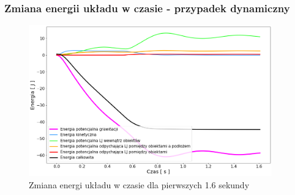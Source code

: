 \documentclass{beamer}
\begin{document}
\begin{frame}
    \frametitle{Zmiana energii układu w czasie - przypadek dynamiczny}

    \begin{figure}[H]
        \centering
        \includegraphics[width=10.5cm]{pressure_energy02_02}
        \caption{
            Zmiana energi układu w czasie dla pierwszych 1.6 sekundy
        }
    \end{figure}
\end{frame}
\end{document}

